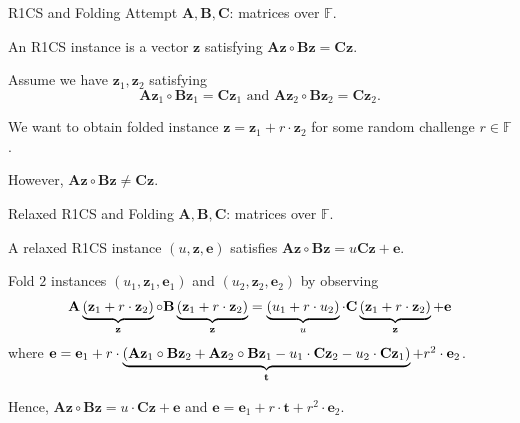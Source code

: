 \begin{frame}{R1CS and Folding Attempt}
	$\mathbf{A}, \mathbf{B}, \mathbf{C}$: matrices over $\mathbb{F}$.
	
	An R1CS instance is a vector $\mathbf{z}$ satisfying $\mathbf{A}\mathbf{z}\circ\mathbf{B}\mathbf{z} = \mathbf{C}\mathbf{z}$.
	
	Assume we have $\mathbf{z}_1, \mathbf{z}_2$ satisfying $$\mathbf{A}\mathbf{z}_1\circ\mathbf{B}\mathbf{z}_1 = \mathbf{C}\mathbf{z}_1 \text{ and } \mathbf{A}\mathbf{z}_2\circ\mathbf{B}\mathbf{z}_2 = \mathbf{C}\mathbf{z}_2.$$
	
	We want to obtain folded instance $\mathbf{z} = \mathbf{z}_1 + r\cdot\mathbf{z}_2$ for some random challenge $r \in \mathbb{F}$.
	
	However, $\mathbf{A}\mathbf{z}\circ \mathbf{B}\mathbf{z} \not= \mathbf{C}\mathbf{z}$.
\end{frame}

\begin{frame}{Relaxed R1CS and Folding}
	$\mathbf{A}, \mathbf{B}, \mathbf{C}$: matrices over $\mathbb{F}$.
	
	A relaxed R1CS instance $(u, \mathbf{z}, \mathbf{e})$ satisfies $\mathbf{A}\mathbf{z}\circ \mathbf{B}\mathbf{z} = u\mathbf{C}\mathbf{z} + \mathbf{e}$. 
	
	Fold $2$ instances $(u_1, \mathbf{z}_1, \mathbf{e}_1)$ and $(u_2, \mathbf{z}_2, \mathbf{e}_2)$ by observing
	\begin{equation*}
		\begin{aligned}
			\mathbf{A}\underbrace{(\mathbf{z}_1 + r\cdot \mathbf{z}_2)}_{\mathbf{z}} \circ\mathbf{B}\underbrace{(\mathbf{z}_1 + r\cdot \mathbf{z}_2)}_{\mathbf{z}} = \underbrace{(u_1 + r\cdot u_2)}_{u}\cdot\mathbf{C}\underbrace{(\mathbf{z}_1 + r\cdot \mathbf{z}_2)}_{\mathbf{z}} + \mathbf{e}
		\end{aligned}
	\end{equation*}
	where $\mathbf{e} = \mathbf{e}_1 + r\cdot \underbrace{(\mathbf{A}\mathbf{z}_1\circ\mathbf{B}\mathbf{z}_2 + \mathbf{A}\mathbf{z}_2 \circ\mathbf{B}\mathbf{z}_1 - u_1\cdot\mathbf{C}\mathbf{z}_2 - u_2\cdot\mathbf{C}\mathbf{z}_1)}_{\mathbf{t}} + r^2\cdot\mathbf{e}_2$.
	
	Hence, $\mathbf{A}\mathbf{z}\circ\mathbf{B}\mathbf{z} = u\cdot \mathbf{C}\mathbf{z} + \mathbf{e}$ and $\mathbf{e} = \mathbf{e}_1 + r\cdot\mathbf{t} + r^2\cdot\mathbf{e}_2$.
\end{frame}

